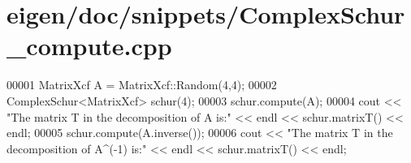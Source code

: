 \hypertarget{eigen_2doc_2snippets_2_complex_schur__compute_8cpp_source}{}\section{eigen/doc/snippets/\+Complex\+Schur\+\_\+compute.cpp}
\label{eigen_2doc_2snippets_2_complex_schur__compute_8cpp_source}

\begin{DoxyCode}
00001 MatrixXcf A = MatrixXcf::Random(4,4);
00002 ComplexSchur<MatrixXcf> schur(4);
00003 schur.compute(A);
00004 cout << \textcolor{stringliteral}{"The matrix T in the decomposition of A is:"} << endl << schur.matrixT() << endl;
00005 schur.compute(A.inverse());
00006 cout << \textcolor{stringliteral}{"The matrix T in the decomposition of A^(-1) is:"} << endl << schur.matrixT() << endl;
\end{DoxyCode}
